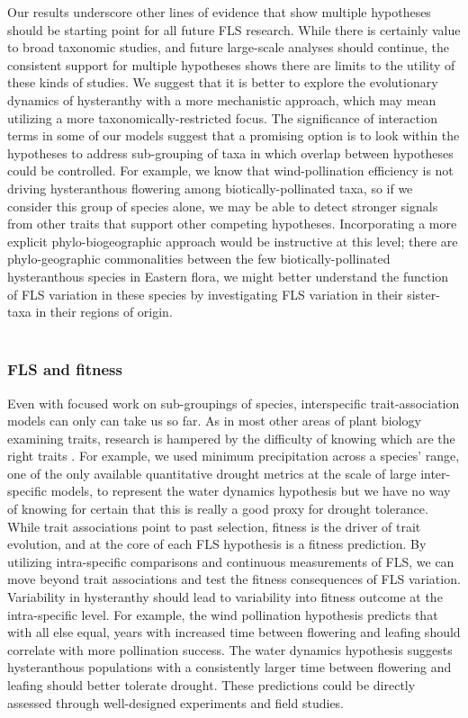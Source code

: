 \documentclass{article}
\begin{document}
\indent\indent Our results underscore other lines of evidence that show multiple hypotheses should be starting point for all future FLS research. While there is certainly value to broad taxonomic studies, and future large-scale analyses should continue, the consistent support for multiple hypotheses shows there are limits to the utility of these kinds of studies. We suggest that it is better to explore the evolutionary dynamics of hysteranthy with a more mechanistic approach, which may mean utilizing a more taxonomically-restricted focus. The significance of interaction terms in some of our models suggest that a promising option is to look within the hypotheses to address sub-grouping of taxa in which overlap between hypotheses could be controlled. For example, we know that wind-pollination efficiency is not driving hysteranthous flowering among biotically-pollinated taxa, so if we consider this group of species alone, we may be able to detect stronger signals from other traits that support other competing hypotheses. Incorporating a more explicit phylo-biogeographic approach would be instructive at this level; there are phylo-geographic commonalities between the few biotically-pollinated hysteranthous species in Eastern flora, we might better understand the function of FLS variation in these species by investigating FLS variation in their sister-taxa in their regions of origin.\\ 

\subsubsection*{FLS and fitness}
Even with focused work on sub-groupings of species, interspecific trait-association models can only can take us so far. As in most other areas of plant biology examining traits, research is hampered by the difficulty of knowing which are the right traits \citep{}. For example, we used minimum precipitation across a species' range, one of the only available quantitative drought metrics at the scale of large inter-specific models, to represent the water dynamics hypothesis but we have no way of knowing for certain that this is really a good proxy for drought tolerance. \\

While trait associations point to past selection, fitness is the driver of trait evolution, and at the core of each FLS hypothesis is a fitness prediction. By utilizing intra-specific comparisons and continuous measurements of FLS, we can move beyond trait associations and test the fitness consequences of FLS variation. \\
\indent Variability in hysteranthy should lead to variability into fitness outcome at the intra-specific level. For example, the wind pollination hypothesis predicts that with all else equal, years with increased time between flowering and leafing should correlate with more pollination success. The water dynamics hypothesis suggests hysteranthous populations with a consistently larger time between flowering and leafing should better tolerate drought. These predictions could be directly assessed through well-designed experiments and field studies.\\
\end{document}

